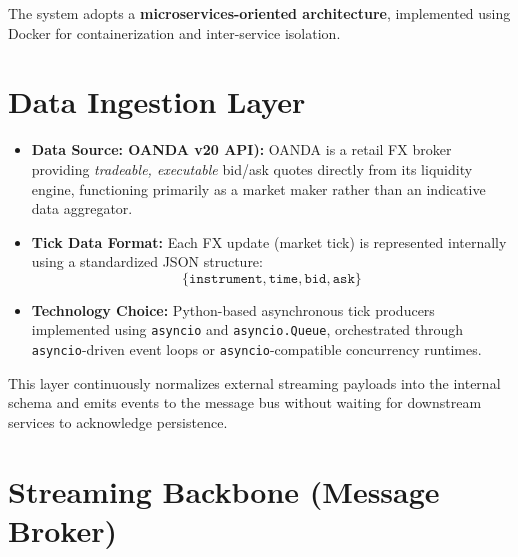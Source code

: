 \documentclass[letterpaper,11pt]{report}
\begin{document}
The system adopts a \textbf{microservices-oriented architecture}, implemented using Docker for containerization and inter-service isolation.


\section{Data Ingestion Layer}

\begin{itemize}
    \item \textbf{Data Source: OANDA v20 API):}  
    OANDA is a retail FX broker providing \emph{tradeable, executable} bid/ask quotes directly from its liquidity engine, functioning primarily as a market maker rather than an indicative data aggregator.

    \item \textbf{Tick Data Format:}  
    Each FX update (market tick) is represented internally using a standardized JSON structure:
    \begin{equation}
        \{\texttt{instrument}, \texttt{time}, \texttt{bid}, \texttt{ask}\}
    \end{equation}

    \item \textbf{Technology Choice:} Python-based asynchronous tick producers implemented using \texttt{asyncio} and \texttt{asyncio.Queue}, orchestrated through \texttt{asyncio}-driven event loops or \texttt{asyncio}-compatible concurrency runtimes.
\end{itemize}

This layer continuously normalizes external streaming payloads into the internal schema and emits events to the message bus without waiting for downstream services to acknowledge persistence.


\section{Streaming Backbone (Message Broker)}
\end{document}
